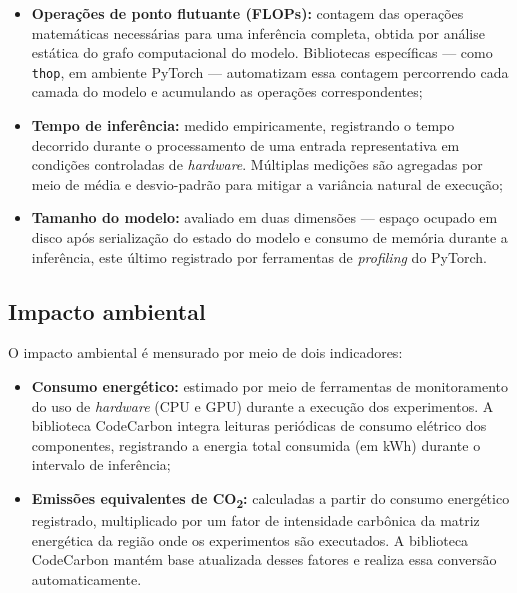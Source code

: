 {\begin{itemize}
    \item \textbf{Operações de ponto flutuante (FLOPs):} contagem das operações matemáticas
          necessárias para uma inferência completa, obtida por análise estática do grafo
          computacional do modelo. Bibliotecas específicas --- como \texttt{thop}, em
          ambiente PyTorch --- automatizam essa contagem percorrendo cada camada do modelo
          e acumulando as operações correspondentes;

    \item \textbf{Tempo de inferência:} medido empiricamente, registrando o tempo decorrido
          durante o processamento de uma entrada representativa em condições controladas de
          \textit{hardware}. Múltiplas medições são agregadas por meio de média e
          desvio-padrão para mitigar a variância natural de execução;

    \item \textbf{Tamanho do modelo:} avaliado em duas dimensões --- espaço ocupado em disco
          após serialização do estado do modelo e consumo de memória durante a inferência,
          este último registrado por ferramentas de \textit{profiling} do PyTorch.
\end{itemize}

\subsection*{Impacto ambiental}

O impacto ambiental é mensurado por meio de dois indicadores:

\begin{itemize}
    \item \textbf{Consumo energético:} estimado por meio de ferramentas de monitoramento do
          uso de \textit{hardware} (CPU e GPU) durante a execução dos experimentos. A
          biblioteca CodeCarbon \cite{CodeCarbon2023} integra leituras periódicas de consumo
          elétrico dos componentes, registrando a energia total consumida (em kWh) durante
          o intervalo de inferência;

    \item \textbf{Emissões equivalentes de CO\textsubscript{2}:} calculadas a partir do
          consumo energético registrado, multiplicado por um fator de intensidade carbônica
          da matriz energética da região onde os experimentos são executados. A biblioteca
          CodeCarbon mantém base atualizada desses fatores e realiza essa conversão
          automaticamente.
\end{itemize}

}

